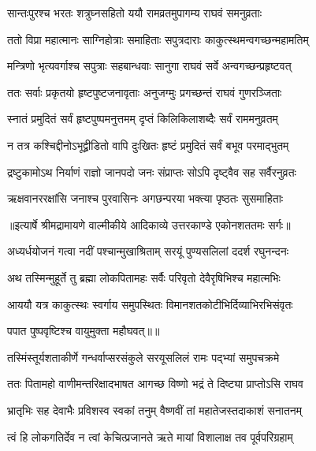 \twolineshloka
{सान्तःपुरश्च भरतः शत्रुघ्नसहितो ययौ}
{रामव्रतमुपागम्य राघवं समनुव्रताः} %

\twolineshloka
{ततो विप्रा महात्मानः साग्निहोत्राः समाहिताः}
{सपुत्रदाराः काकुत्स्थमन्वगच्छन्महामतिम्} %

\twolineshloka
{मन्त्रिणो भृत्यवर्गाश्च सपुत्राः सहबान्धवाः}
{सानुगा राघवं सर्वे अन्वगच्छन्प्रहृष्टवत्} %

\twolineshloka
{ततः सर्वाः प्रकृतयो हृष्टपुष्टजनावृताः}
{अनुजग्मुः प्रगच्छन्तं राघवं गुणरञ्जिताः} %

\twolineshloka
{स्नातं प्रमुदितं सर्वं हृष्टपुष्पमनुत्तमम्}
{दृप्तं किलिकिलाशब्दैः सर्वं राममनुव्रतम्} %

\twolineshloka
{न तत्र कश्चिद्दीनोऽभूद्व्रीडितो वापि दुःखितः}
{हृष्टं प्रमुदितं सर्वं बभूव परमाद्भुतम्} %

\twolineshloka
{द्रष्टुकामोऽथ निर्याणं राज्ञो जानपदो जनः}
{संप्राप्तः सोऽपि दृष्ट्वैव सह सर्वैरनुव्रतः} %

\twolineshloka
{ऋक्षवानररक्षांसि जनाश्च पुरवासिनः}
{अगछन्परया भक्त्या पृष्ठतः सुसमाहिताः} %


{॥इत्यार्षे श्रीमद्रामायणे वाल्मीकीये आदिकाव्ये उत्तरकाण्डे एकोनशततमः सर्गः॥}


\twolineshloka
{अध्यर्धयोजनं गत्वा नदीं पश्चान्मुखाश्रिताम्}
{सरयूं पुण्यसलिलां ददर्श रघुनन्दनः} %

\twolineshloka
{अथ तस्मिन्मुहूर्ते तु ब्रह्मा लोकपितामहः}
{सर्वैः परिवृतो देवैरृषिभिश्च महात्मभिः} %

\twolineshloka
{आययौ यत्र काकुत्स्थः स्वर्गाय समुपस्थितः}
{विमानशतकोटीभिर्दिव्याभिरभिसंवृतः} %

{पपात पुष्पवृष्टिश्च वायुमुक्ता महौघवत्॥॥} %

\addtocounter{shlokacount}{1}

\twolineshloka
{तस्मिंस्तूर्यशताकीर्णे गन्धर्वाप्सरसंकुले}
{सरयूसलिलं रामः पद्भ्यां समुपचक्रमे} %

\twolineshloka
{ततः पितामहो वाणीमन्तरिक्षादभाषत}
{आगच्छ विष्णो भद्रं ते दिष्ट्या प्राप्तोऽसि राघव} %

\twolineshloka
{भ्रातृभिः सह देवाभैः प्रविशस्व स्वकां तनुम्}
{वैष्णवीं तां महातेजस्तदाकाशं सनातनम्} %

\twolineshloka
{त्वं हि लोकगतिर्देव न त्वां केचित्प्रजानते}
{ऋते मायां विशालाक्ष तव पूर्वपरिग्रहाम्} %

